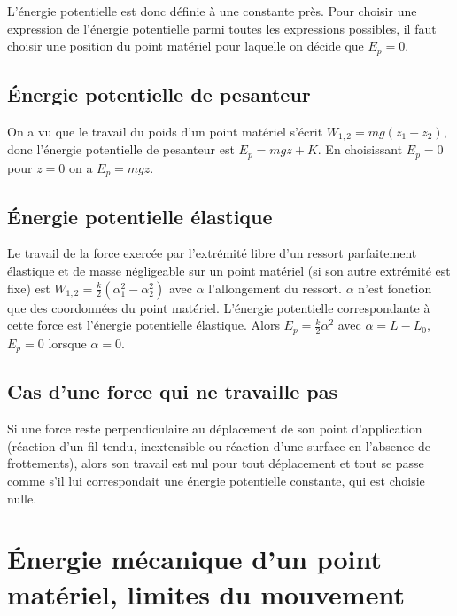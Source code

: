 L'énergie potentielle est donc définie à une constante près. Pour choisir une 
expression de l'énergie potentielle parmi toutes les expressions possibles, il 
faut choisir une position du point matériel pour laquelle on décide que 
\(E_p=0\).

\subsection{Énergie potentielle de pesanteur}%
\label{chap4-subsec:NRJPotPes}%

On a vu que le travail du poids d'un point matériel s'écrit \(W_{1, 
2}=mg(z_1-z_2)\), donc l'énergie potentielle de pesanteur est \(E_p = mgz +K\). 
En choisissant \(E_p=0\) pour \(z=0\) on a \(E_p=mgz\).

\subsection{Énergie potentielle élastique}%
\label{chap4-subsec:NRJPotElast}%

Le travail de la force exercée par l'extrémité libre d'un ressort parfaitement 
élastique et de masse négligeable sur un point matériel (si son autre extrémité 
est fixe) est \(W_{1, 2} = \frac{k}{2}(\alpha_1^2-\alpha_2^2)\) avec \(\alpha\) 
l'allongement du ressort. \(\alpha\) n'est fonction que des coordonnées du 
point matériel. L'énergie potentielle correspondante à cette force est 
l'énergie potentielle élastique. Alors \(E_p = \frac{k}{2}\alpha^2\) avec 
\(\alpha=L-L_0\), \(E_p=0\) lorsque \(\alpha=0\).

\subsection{Cas d'une force qui ne travaille pas}%
\label{chap4-subsec:casduneforcequinetravaillepas}%

Si une force reste perpendiculaire au déplacement de son point d'application 
(réaction d'un fil tendu, inextensible ou réaction d'une surface en l'absence 
de frottements), alors son travail est nul pour tout déplacement et tout se 
passe comme s'il lui correspondait une énergie potentielle constante, qui est 
choisie nulle.

\section{Énergie mécanique d'un point matériel, limites du mouvement}%
\label{chap4-sec:NRJmecanique}%


